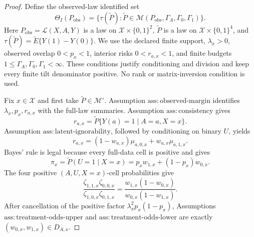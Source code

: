 \documentclass{article}
\begin{document}
\begin{proof}
Define the observed-law identified set
\[
 \Theta_I(P_{\mathrm{obs}})
 =\{\tau(\widetilde P):
       \widetilde P\in\mathcal M(P_{\mathrm{obs}},\Gamma_A,\Gamma_0,\Gamma_1)\}.
                                                                            \tag{38}
\]
Here \(P_{\mathrm{obs}}=\mathcal L(X,A,Y)\) is a law on \(\mathcal X\times\{0,1\}^2\), \(\widetilde P\) is a law on \(\mathcal X\times\{0,1\}^4\), and \(\tau(\widetilde P)=\widetilde E\{Y(1)-Y(0)\}\).  We use the declared finite support, \(\lambda_x>0\), observed overlap \(0<p_x<1\), interior risks \(0<r_{a,x}<1\), and finite budgets \(1\leq\Gamma_A,\Gamma_0,\Gamma_1<\infty\).  These conditions justify conditioning and division and keep every finite tilt denominator positive.  No rank or matrix-inversion condition is used.

Fix \(x\in\mathcal X\) and first take \(\widetilde P\in\mathcal M^{\circ}\).  Assumption \(\mathrm{ass{:}observed\text{-}margin}\) identifies \(\lambda_x,p_x,r_{a,x}\) with the full-law summaries.  Assumption \(\mathrm{ass{:}consistency}\) gives
\[
 r_{a,x}=\widetilde P\{Y(a)=1\mid A=a,X=x\}.
\]
Assumption \(\mathrm{ass{:}latent\text{-}ignorability}\), followed by conditioning on binary \(U\), yields
\[
 r_{a,x}=(1-w_{a,x})\mu_{a,0,x}+w_{a,x}\mu_{a,1,x}.                    \tag{39}
\]
Bayes' rule is legal because every full-data cell is positive and gives
\[
 \pi_x=\widetilde P(U=1\mid X=x)
      =p_xw_{1,x}+(1-p_x)w_{0,x}.                                      \tag{40}
\]
The four positive \((A,U,X=x)\)-cell probabilities give
\[
 \frac{\zeta_{1,1,x}\zeta_{0,0,x}}
      {\zeta_{1,0,x}\zeta_{0,1,x}}
 =\frac{w_{1,x}(1-w_{0,x})}{w_{0,x}(1-w_{1,x})}.                       \tag{41}
\]
After cancellation of the positive factor \(\lambda_x^2p_x(1-p_x)\), Assumptions \(\mathrm{ass{:}treatment\text{-}odds\text{-}upper}\) and \(\mathrm{ass{:}treatment\text{-}odds\text{-}lower}\) are exactly \((w_{0,x},w_{1,x})\in D_{A,x}\).


\end{proof}
\end{document}

